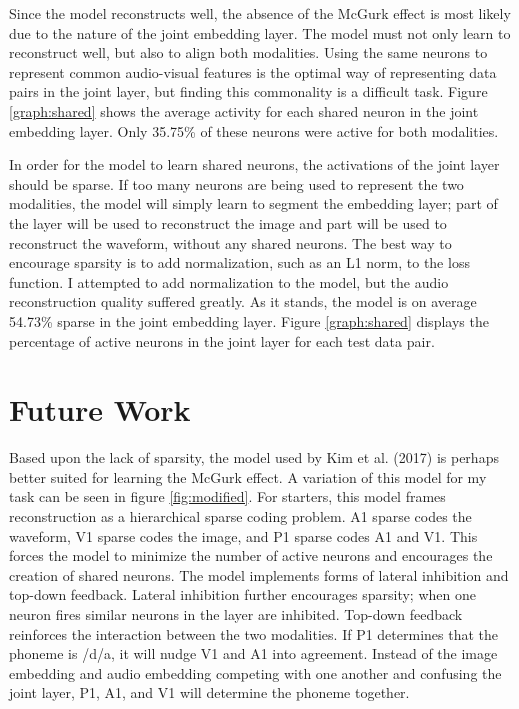 \documentclass[conference]{IEEEtran}
\begin{document}
Since the model reconstructs well, the absence of the McGurk effect is most likely due to the nature of the joint embedding layer. The model must not only learn to reconstruct well, but also to align both modalities. Using the same neurons to represent common audio-visual features is the optimal way of representing data pairs in the joint layer, but finding this commonality is a difficult task. Figure \ref{graph:shared} shows the average activity for each shared neuron in the joint embedding layer. Only 35.75\% of these neurons were active for both modalities.

In order for the model to learn shared neurons, the activations of the joint layer should be sparse. If too many neurons are being used to represent the two modalities, the model will simply learn to segment the embedding layer; part of the layer will be used to reconstruct the image and part will be used to reconstruct the waveform, without any shared neurons. The best way to encourage sparsity is to add normalization, such as an L1 norm, to the loss function. I attempted to add normalization to the model, but the audio reconstruction quality suffered greatly. As it stands, the model is on average 54.73\% sparse in the joint embedding layer. Figure \ref{graph:shared} displays the percentage of active neurons in the joint layer for each test data pair.

\section{Future Work}
Based upon the lack of sparsity, the model used by Kim et al. (2017) is perhaps better suited for learning the McGurk effect.\cite{Kim2017} A variation of this model for my task can be seen in figure \ref{fig:modified}. For starters, this model frames reconstruction as a hierarchical sparse coding problem. A1 sparse codes the waveform, V1 sparse codes the image, and P1 sparse codes A1 and V1. This forces the model to minimize the number of active neurons and encourages the creation of shared neurons. The model implements forms of lateral inhibition and top-down feedback. Lateral inhibition further encourages sparsity; when one neuron fires similar neurons in the layer are inhibited. Top-down feedback reinforces the interaction between the two modalities. If P1 determines that the phoneme is /d/a, it will nudge V1 and A1 into agreement. Instead of the image embedding and audio embedding competing with one another and confusing the joint layer, P1, A1, and V1 will determine the phoneme together.
\end{document}
